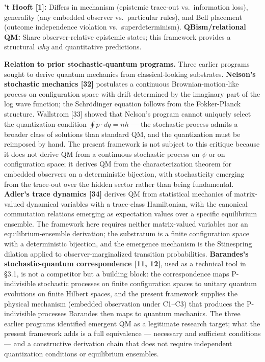 \documentclass[
]{article}
\begin{document}
\textbf{'t Hooft {[}1{]}:} Differs in mechanism (epistemic trace-out
vs.~information loss), generality (any embedded observer vs.~particular
rules), and Bell placement (outcome independence violation
vs.~superdeterminism). \textbf{QBism/relational QM:} Share
observer-relative epistemic states; this framework provides a structural
\emph{why} and quantitative predictions.

\textbf{Relation to prior stochastic-quantum programs.} Three earlier
programs sought to derive quantum mechanics from classical-looking
substrates. \textbf{Nelson's stochastic mechanics {[}32{]}} postulates a
continuous Brownian-motion-like process on configuration space with
drift determined by the imaginary part of the log wave function; the
Schrödinger equation follows from the Fokker-Planck structure. Wallstrom
{[}33{]} showed that Nelson's program cannot uniquely select the
quantization condition \(\oint p \cdot dq = nh\) --- the stochastic
process admits a broader class of solutions than standard QM, and the
quantization must be reimposed by hand. The present framework is not
subject to this critique because it does not derive QM from a continuous
stochastic process on \(\psi\) or on configuration space; it derives QM
from the characterization theorem for embedded observers on a
deterministic bijection, with stochasticity emerging from the trace-out
over the hidden sector rather than being fundamental. \textbf{Adler's
trace dynamics {[}34{]}} derives QM from statistical mechanics of
matrix-valued dynamical variables with a trace-class Hamiltonian, with
the canonical commutation relations emerging as expectation values over
a specific equilibrium ensemble. The framework here requires neither
matrix-valued variables nor an equilibrium-ensemble derivation; the
substratum is a finite configuration space with a deterministic
bijection, and the emergence mechanism is the Stinespring dilation
applied to observer-marginalized transition probabilities.
\textbf{Barandes's stochastic-quantum correspondence {[}11, 12{]}}, used
as a technical tool in §3.1, is not a competitor but a building block:
the correspondence maps P-indivisible stochastic processes on finite
configuration spaces to unitary quantum evolutions on finite Hilbert
spaces, and the present framework supplies the physical mechanism
(embedded observation under C1--C3) that produces the P-indivisible
processes Barandes then maps to quantum mechanics. The three earlier
programs identified emergent QM as a legitimate research target; what
the present framework adds is a full equivalence --- necessary and
sufficient conditions --- and a constructive derivation chain that does
not require independent quantization conditions or equilibrium
ensembles.
\end{document}
